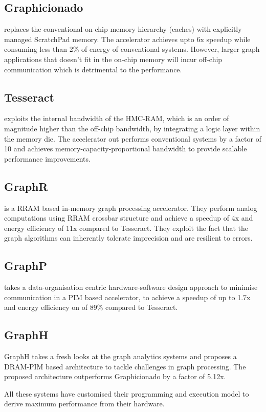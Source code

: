  \subsection{Graphicionado} \cite{Graphicionado} replaces the conventional on-chip memory hierarchy (caches) with explicitly managed ScratchPad memory. The accelerator achieves upto 6x speedup while consuming less than 2\% of energy of conventional systems. However, larger graph applications that doesn't fit in the on-chip memory will incur off-chip communication which is detrimental to the performance.

 \subsection{Tesseract} \cite{Tesseract} exploits the internal bandwidth of the HMC-RAM, which is an order of magnitude higher than the off-chip bandwidth, by integrating a logic layer within the memory die. The accelerator out performs conventional systems by a factor of 10 and achieves memory-capacity-proportional bandwidth to provide scalable performance improvements.

 \subsection{GraphR} \cite{GraphR} is a RRAM based in-memory graph processing accelerator. They perform analog computations using RRAM crossbar structure and achieve a speedup of 4x and energy efficiency of 11x compared to Tesseract. They exploit the fact that the graph algorithms can inherently tolerate imprecision and are resilient to errors.
 
 \subsection{GraphP} \cite{GraphP} takes a data-organisation centric hardware-software design approach to minimise communication in a PIM based accelerator, to achieve a speedup of up to 1.7x and energy efficiency on of 89\% compared to Tesseract.
 
 \subsection{GraphH} \cite{GraphH} GraphH takes a fresh looks at the graph analytics systems and proposes a DRAM-PIM based architecture to tackle challenges in graph processing. The proposed architecture outperforms Graphicionado by a factor of 5.12x.

All these systems have customised their programming and execution model to derive maximum performance from their hardware.
